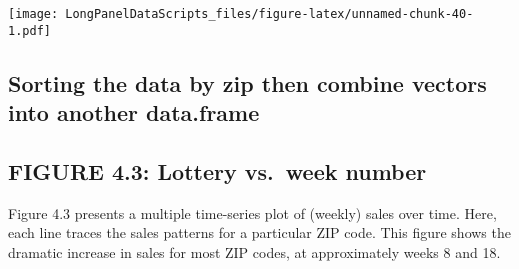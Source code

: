 \documentclass[]{book}
\newenvironment{Shaded}{\begin{snugshade}}{\end{snugshade}}
\newcommand{\KeywordTok}[1]{\textcolor[rgb]{0.13,0.29,0.53}{\textbf{#1}}}
\newcommand{\NormalTok}[1]{#1}
\newcommand{\OperatorTok}[1]{\textcolor[rgb]{0.81,0.36,0.00}{\textbf{#1}}}
\newcommand{\StringTok}[1]{\textcolor[rgb]{0.31,0.60,0.02}{#1}}
\begin{document}
\texttt{[image: LongPanelDataScripts\_files/figure-latex/unnamed-chunk-40-1.pdf]}

\hypertarget{sorting-the-data-by-zip-then-combine-vectors-into-another-data.frame}{%
\subsection{Sorting the data by zip then combine vectors into another data.frame}\label{sorting-the-data-by-zip-then-combine-vectors-into-another-data.frame}}

\begin{Shaded}
\end{Shaded}

\hypertarget{figure-4.3-lottery-vs.-week-number}{%
\subsection{FIGURE 4.3: Lottery vs.~week number}\label{figure-4.3-lottery-vs.-week-number}}

Figure 4.3 presents a multiple time-series plot of (weekly) sales over time. Here, each line traces the sales patterns for a particular ZIP code. This figure shows the dramatic increase in sales for most ZIP codes, at approximately weeks 8 and 18.
\end{document}
